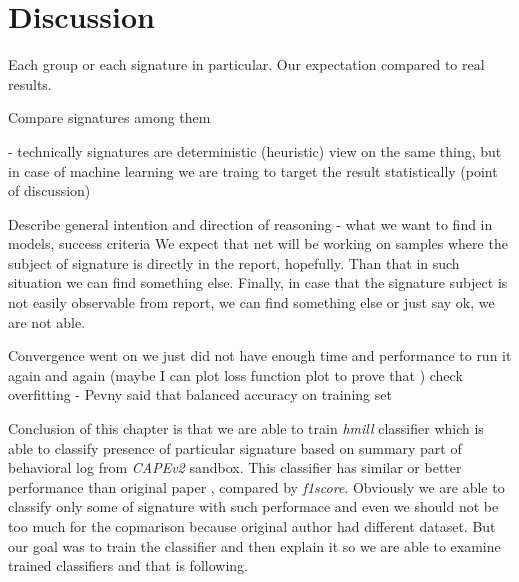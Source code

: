 \section{Discussion}
Each group or each signature in particular. Our expectation compared to real results.

Compare signatures among them

- technically signatures are deterministic (heuristic) view on the same thing, but in case of machine learning we are traing to target the result statistically (point of discussion)


Describe general intention and direction of reasoning - what we want to find in models, success criteria
We expect that net will be working on samples where the subject of signature is directly in the report, hopefully. Than that in such situation we can find something else. Finally, in case that the signature subject is not easily observable from report, we can find something else or just say ok, we are not able.

Convergence went on we just did not have enough time and performance to run it again and again (maybe I can plot loss function plot to prove that )
check overfitting - Pevny said that balanced accuracy on training set

Conclusion of this chapter is that we are able to train \emph{hmill} classifier which is able to classify presence of particular signature based on summary part of behavioral log from \emph{CAPEv2} sandbox. This classifier has similar or better performance than original paper \cite{Mandlik2020}, compared by \emph{f1score}. Obviously we are able to classify only some of signature with such performace and even we should not be too much for the copmarison because original author had different dataset. But our goal was to train the classifier and then explain it so we are able to examine trained classifiers and that is following.

